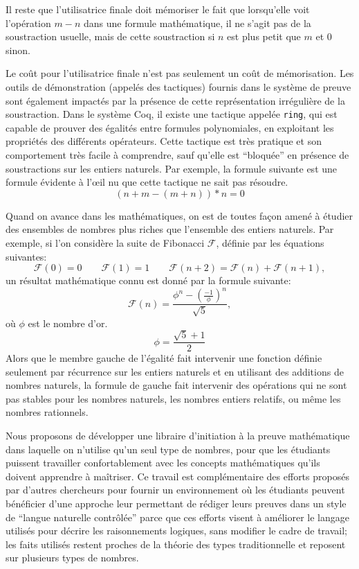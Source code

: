 \documentclass[draft]{jflart}
\begin{document}
Il reste que l'utilisatrice finale doit mémoriser le fait que
lorsqu'elle voit l'opération \(m - n\) dans une formule mathématique,
il ne s'agit pas de la soustraction usuelle, mais de cette
soustraction si \(n\) est plus petit que \(m\) et 0 sinon.

Le coût pour l'utilisatrice finale n'est pas seulement un coût de
mémorisation.  Les outils de démonstration (appelés des tactiques)
fournis dans le système de preuve sont également impactés par la
présence de cette représentation irrégulière de la soustraction.
Dans le système Coq, il existe une tactique appelée \texttt{ring}, qui
est capable de prouver des égalités entre formules polynomiales, en
exploitant les propriétés des différents opérateurs.  Cette tactique
est très pratique et son comportement très facile à comprendre, sauf
qu'elle est ``bloquée'' en présence de soustractions sur les entiers
naturels.  Par exemple, la formule suivante est une formule évidente à
l'œil nu que cette tactique ne sait pas résoudre.
\[(n + m - (m + n)) * n = 0\]

Quand on avance dans les mathématiques, on est de toutes façon amené à
étudier des ensembles de nombres plus riches que l'ensemble des
entiers naturels.  Par exemple, si l'on considère la suite de
Fibonacci \({\mathcal F}\), définie par les équations suivantes:
\[{\mathcal F}(0) = 0 \qquad {\mathcal F}(1)= 1\qquad {\mathcal F}(n +
2) = {\mathcal F}(n) + {\mathcal F}(n + 1),\]
un résultat mathématique connu est donné par la formule suivante:
\[{\mathcal F} (n) = \frac{\phi ^n - ({\frac{-1}{\phi}}) ^
  n}{\sqrt{5}},\]
où \(\phi\) est le nombre d'or.
\[\phi = \frac{\sqrt{5} + 1}{2}\]
Alors que le membre gauche de l'égalité fait intervenir une fonction définie
seulement par récurrence sur les entiers naturels et en utilisant des
additions de nombres naturels, la formule de gauche fait intervenir des
opérations qui ne sont pas stables pour les nombres naturels, les nombres
entiers relatifs, ou même les nombres rationnels.

Nous proposons de développer une libraire d'initiation à la preuve
mathématique dans laquelle on n'utilise qu'un seul type de nombres,
pour que les étudiants puissent travailler confortablement avec les
concepts mathématiques qu'ils doivent apprendre à maîtriser.  Ce
travail est complémentaire des efforts proposés par d'autres
chercheurs pour fournir un environnement où les étudiants peuvent
bénéficier d'une approche leur permettant de rédiger leurs preuves
dans un style de ``langue naturelle contrôlée'' parce que ces efforts
visent à améliorer le langage utilisés pour décrire les raisonnements
logiques, sans modifier le cadre de travail; les faits utilisés
restent proches de la théorie des types traditionnelle et reposent sur
plusieurs types de nombres.
\end{document}
